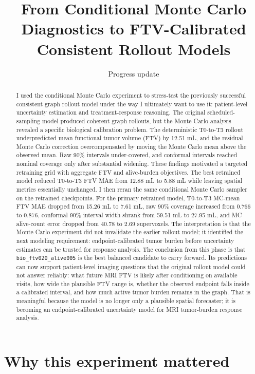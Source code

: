 \documentclass[11pt]{article}
\title{From Conditional Monte Carlo Diagnostics to FTV-Calibrated Consistent Rollout Models}
\author{}
\date{Progress update}
\begin{document}
\maketitle

\begin{abstract}
I used the conditional Monte Carlo experiment to stress-test the previously
successful consistent graph rollout model under the way I ultimately want to
use it: patient-level uncertainty estimation and treatment-response reasoning.
The original scheduled-sampling model produced coherent graph rollouts, but the
Monte Carlo analysis revealed a specific biological calibration problem. The
deterministic T0-to-T3 rollout underpredicted mean functional tumor volume
(FTV) by 12.51 mL, and the residual Monte Carlo correction overcompensated by
moving the Monte Carlo mean above the observed mean. Raw 90\% intervals
under-covered, and conformal intervals reached nominal coverage only after
substantial widening. These findings motivated a targeted retraining grid with
aggregate FTV and alive-burden objectives. The best retrained model reduced
T0-to-T3 FTV MAE from
12.88 mL to 5.88 mL while leaving spatial metrics essentially unchanged. I then
reran the same conditional Monte Carlo sampler on the retrained checkpoints.
For the primary retrained model, T0-to-T3 MC-mean FTV MAE dropped from
15.26 mL to 7.61 mL, raw 90\% coverage increased from 0.766 to 0.876, conformal
90\% interval width shrank from 59.51 mL to 27.95 mL, and MC alive-count error
dropped from 40.78 to 2.69 supervoxels. The interpretation is that the Monte
Carlo experiment did not invalidate the earlier rollout model; it identified
the next modeling requirement: endpoint-calibrated tumor burden before
uncertainty estimates can be trusted for response analysis. The conclusion from
this phase is that \texttt{bio\_ftv020\_alive005} is the best balanced
candidate to carry forward. Its predictions can now support patient-level
imaging questions that the original rollout model could not answer reliably:
what future MRI FTV is likely after conditioning on available visits, how wide
the plausible FTV range is, whether the observed endpoint falls inside a
calibrated interval, and how much active tumor burden remains in the graph.
That is meaningful because the model is no longer only a plausible spatial
forecaster; it is becoming an endpoint-calibrated uncertainty model for MRI
tumor-burden response analysis.
\end{abstract}

\section{Why this experiment mattered}
\end{document}
